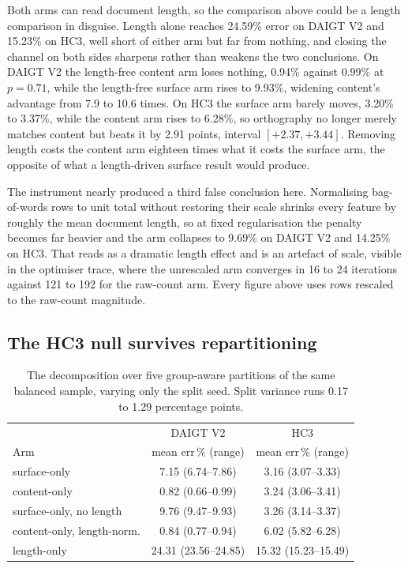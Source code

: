 Both arms can read document length, so the comparison above could be a length comparison in disguise. Length alone reaches 24.59\% error on DAIGT V2 and 15.23\% on HC3, well short of either arm but far from nothing, and closing the channel on both sides sharpens rather than weakens the two conclusions. On DAIGT V2 the length-free content arm loses nothing, 0.94\% against 0.99\% at $p=0.71$, while the length-free surface arm rises to 9.93\%, widening content's advantage from 7.9 to 10.6 times. On HC3 the surface arm barely moves, 3.20\% to 3.37\%, while the content arm rises to 6.28\%, so orthography no longer merely matches content but beats it by 2.91 points, interval $[+2.37, +3.44]$. Removing length costs the content arm eighteen times what it costs the surface arm, the opposite of what a length-driven surface result would produce.

The instrument nearly produced a third false conclusion here. Normalising bag-of-words rows to unit total without restoring their scale shrinks every feature by roughly the mean document length, so at fixed regularisation the penalty becomes far heavier and the arm collapses to 9.69\% on DAIGT V2 and 14.25\% on HC3. That reads as a dramatic length effect and is an artefact of scale, visible in the optimiser trace, where the unrescaled arm converges in 16 to 24 iterations against 121 to 192 for the raw-count arm. Every figure above uses rows rescaled to the raw-count magnitude.

\FloatBarrier
\subsection{The HC3 null survives repartitioning}
\label{sec:multisplit}

\begin{table}[!ht]
\centering
\caption{The decomposition over five group-aware partitions of the same balanced sample, varying only the split seed. Split variance runs 0.17 to 1.29 percentage points.}
\label{tab:multisplit}
\footnotesize
\setlength{\tabcolsep}{3.5pt}
\begin{tabular}{@{}lcc@{}}
\toprule
& DAIGT V2 & HC3 \\
Arm & mean err\,\% (range) & mean err\,\% (range) \\
\midrule
surface-only & 7.15 (6.74--7.86) & 3.16 (3.07--3.33) \\
content-only & 0.82 (0.66--0.99) & 3.24 (3.06--3.41) \\
surface-only, no length & 9.76 (9.47--9.93) & 3.26 (3.14--3.37) \\
content-only, length-norm. & 0.84 (0.77--0.94) & 6.02 (5.82--6.28) \\
length-only & 24.31 (23.56--24.85) & 15.32 (15.23--15.49) \\
\bottomrule
\end{tabular}
\end{table}

